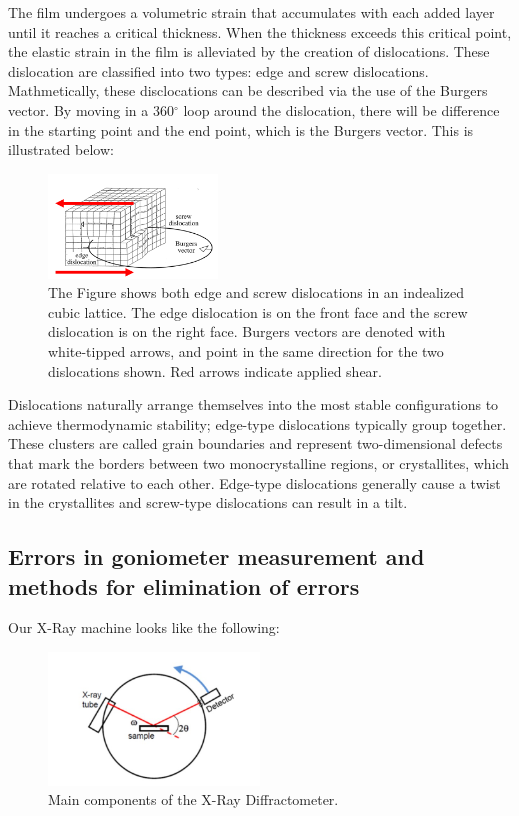\documentclass{article}
\begin{document}
The film undergoes a volumetric strain that accumulates with each added layer until it reaches a critical thickness. When the thickness exceeds this critical point, the elastic strain in the film is alleviated by the creation of dislocations.
These dislocation are classified into two types: edge and screw dislocations. Mathmetically, these disclocations can be described via the use of the Burgers vector. By moving in a 360$^{\circ}$ loop around the dislocation, there will be difference in the starting point and the end point, which is the Burgers vector. This is illustrated below:

\begin{figure}[h]
	\centering
	\includegraphics[width=0.4\textwidth]{Figures/dislocation.png}
	\caption{The Figure shows both edge and screw dislocations in an indealized cubic lattice. The edge dislocation is on the front face and the screw dislocation is on the right face. Burgers vectors are denoted with white-tipped arrows, and point in the same direction for the two dislocations shown. Red arrows indicate applied shear. \cite{passchier_2013_microtectonics} \cite{_2016_relation}}
	\label{fig:burgersvector}
\end{figure}

Dislocations naturally arrange themselves into the most stable configurations to achieve thermodynamic stability; edge-type dislocations typically group together. 
These clusters are called grain boundaries and represent two-dimensional defects that mark the borders between two monocrystalline regions, or crystallites, which are rotated relative to each other.
Edge-type dislocations generally cause a twist in the crystallites and screw-type dislocations can result in a tilt.

\pagebreak{}

\subsection{Errors in goniometer measurement and methods for elimination of errors}

Our X-Ray machine looks like the following:

\begin{figure}[h]
	\centering
	\includegraphics[width=0.5\textwidth]{Figures/Diffractometer.jpg}
	\caption{Main components of the X-Ray Diffractometer.}
	\label{fig:xraymachine}
\end{figure}
\end{document}
